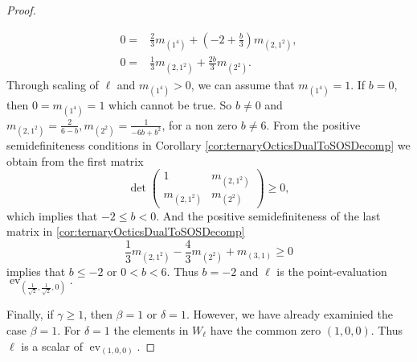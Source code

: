\documentclass[11pt,a4paper]{amsart}
\numberwithin{equation}{section}
\theoremstyle{definition}
\DeclareMathOperator{\ev}{ev}
\numberwithin{thm}{section}
\theoremstyle{break}
\numberwithin{subcase}{case}
\begin{document}
\begin{proof}
\begin{itemize}
 \begin{align*}
     0=& \frac{2}{3}m_{(1^4)}+(-2+\frac{b}{3})m_{(2,1^2)}, \\  0=&\frac{1}{3}m_{(2,1^2)}+\frac{2b}{3}m_{(2^2)}.
 \end{align*} Through scaling of $\ell$ and $m_{(1^4)}>0$, we can assume that $m_{(1^4)} = 1$. If $b = 0$, then $0 =m_{(1^4)} = 1$ which cannot be true. So $b \neq 0$ and $m_{(2,1^2)} = \frac{2}{6-b}, m_{(2^2)} = \frac{1}{-6b+b^2}$, for a non zero $b \neq 6.$ From the positive semidefiniteness conditions in Corollary \ref{cor:ternaryOcticsDualToSOSDecomp} we obtain from the first matrix $$\det \left( \begin{array}{cc}
1     &m_{(2,1^2)}  \\
m_{(2,1^2)}     & m_{(2^2)}
\end{array} \right) \geq 0,$$ which implies that $ -2 \leq b < 0$. And the positive semidefiniteness of the last matrix in \ref{cor:ternaryOcticsDualToSOSDecomp} $$\frac{1}{3}m_{(2,1^2)}-\frac{4}{3}m_{(2^2)}+m_{(3,1)} \geq 0$$ implies that $b \leq -2$ or $0 < b < 6$. Thus $b = -2$ and $\ell$ is the point-evaluation $\ev_{(\frac{1}{\sqrt{2}},\frac{1}{\sqrt{2}},0)}.$
 \end{itemize}
 Finally, if $\gamma \geq 1$, then $\beta=1$ or $\delta=1$. However, we have already examinied the case $\beta=1$. For $\delta = 1$ the elements in $W_\ell$ have the common zero $(1,0,0)$. Thus $\ell$ is a scalar of  $\ev_{(1,0,0)}$.
 \end{proof}
\end{document}
